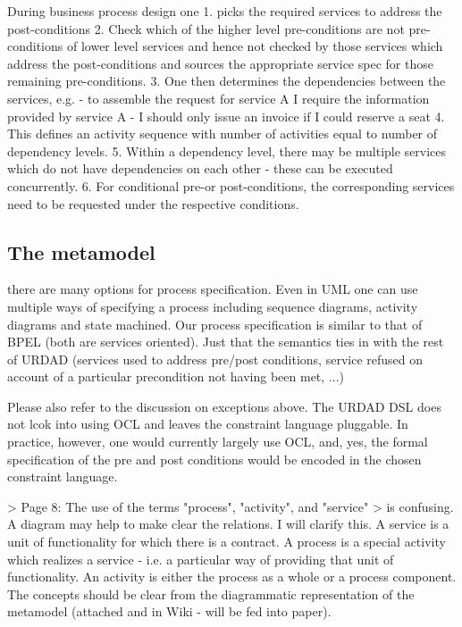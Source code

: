 During business process design one
  1. picks the required services to address the post-conditions
  2. Check which of the higher level pre-conditions are not pre-conditions of lower level services and hence not checked by those services which address the post-conditions and sources the appropriate service spec for those remaining pre-conditions.
  3. One then determines the dependencies between the services, e.g. 
    - to assemble the request for service A I require the information provided by service A
    - I should only issue an invoice if I could reserve a seat
  4. This defines an activity sequence with number of activities equal to number of dependency levels.
  5. Within a dependency level, there may be multiple services which do not have dependencies on each other - these can be executed concurrently.
  6. For conditional pre-or post-conditions, the corresponding services need to be requested under the respective conditions.

\subsection{The metamodel}








there are many options for process specification. Even in UML one can use multiple ways of specifying a process including sequence diagrams, activity diagrams and state machined. Our process specification is similar to that of BPEL (both are services oriented). Just that the semantics ties in with the rest of URDAD (services used to address pre/post conditions, service refused on account of a particular precondition not having been met, ...)

Please also refer to the discussion on exceptions above. The URDAD DSL does not lcok into using OCL and leaves the constraint language pluggable. In practice, however, one would currently largely use OCL, and, yes, the formal specification of the pre and post conditions would be encoded in the chosen constraint language.

> Page 8: The use of the terms "process", "activity", and "service"
> is confusing. A diagram may help to make clear the relations.
I will clarify this. A service is a unit of functionality for which there is a contract. A process is a special activity which realizes a service - i.e. a particular way of providing that unit of functionality. An activity is either the process as a whole or a process component. The concepts should be clear from the diagrammatic representation of the metamodel (attached and in Wiki - will be fed into paper).

